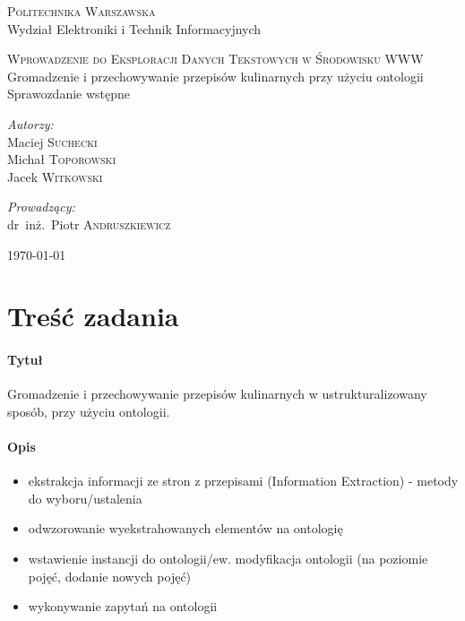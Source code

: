 \documentclass[11pt,a4paper]{article}
\begin{document}
\begin{titlepage}
  \begin{center}

    \textsc{\Large Politechnika Warszawska}\\[0.1cm]
    \small Wydział Elektroniki i Technik Informacyjnych
    \vfill

    \textsc{\small Wprowadzenie do Eksploracji Danych Tekstowych w Środowisku WWW }\\[0.1cm]
    \Huge Gromadzenie i przechowywanie przepisów kulinarnych przy użyciu ontologii\\[1.5cm]
    \small Sprawozdanie wstępne\\[2.5cm]

    \vfill

    \begin{minipage}{0.4\textwidth}
      \begin{flushleft} \large
        \emph{Autorzy:}\\[0.1cm]
        Maciej \textsc{Suchecki}\\
        Michał \textsc{Toporowski}\\
        Jacek \textsc{Witkowski}\\
      \end{flushleft}
    \end{minipage}
    \begin{minipage}{0.4\textwidth}
      \begin{flushright} \large
        \emph{Prowadzący:}\\[0.1cm]
        dr~inż.~Piotr \textsc{Andruszkiewicz}\\[1cm]
      \end{flushright}
    \end{minipage}

    \vfill
    {\large \today}

  \end{center}
\end{titlepage}

\section{Treść zadania}
\paragraph{Tytuł} Gromadzenie i przechowywanie przepisów kulinarnych w ustrukturalizowany sposób, przy użyciu ontologii.
\paragraph{Opis}
\begin{itemize}
  \item ekstrakcja informacji ze stron z przepisami (Information Extraction) - metody do wyboru/ustalenia
  \item odwzorowanie wyekstrahowanych elementów na ontologię
  \item wstawienie instancji do ontologii/ew. modyfikacja ontologii (na poziomie pojęć, dodanie nowych pojęć)
  \item wykonywanie zapytań na ontologii
\end{itemize}
\end{document}
